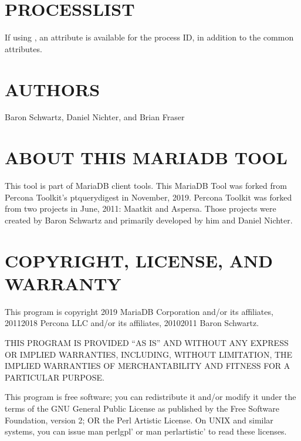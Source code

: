 \documentclass[letterpaper,10pt,english]{sphinxmanual}
\begin{document}
\section{PROCESSLIST}
\label{\detokenize{mariadb-query-digest:processlist}}
\sphinxAtStartPar
If using {\hyperref[\detokenize{mariadb-query-digest:cmdoption-mariadb-query-digest-processlist}]{}}, an  attribute is available for
the process ID, in addition to the common attributes.


\section{AUTHORS}
\label{\detokenize{mariadb-query-digest:authors}}
\sphinxAtStartPar
Baron Schwartz, Daniel Nichter, and Brian Fraser


\section{ABOUT THIS MARIADB TOOL}
\label{\detokenize{mariadb-query-digest:about-this-mariadb-tool}}
\sphinxAtStartPar
This tool is part of MariaDB client tools. This MariaDB Tool was forked from
Percona Toolkit’s pt\sphinxhyphen{}query\sphinxhyphen{}digest in November, 2019.  Percona Toolkit was
forked from two projects in June, 2011: Maatkit and Aspersa.  Those projects
were created by Baron Schwartz and primarily developed by him and Daniel
Nichter.


\section{COPYRIGHT, LICENSE, AND WARRANTY}
\label{\detokenize{mariadb-query-digest:copyright-license-and-warranty}}
\sphinxAtStartPar
This program is copyright 2019 MariaDB Corporation and/or its affiliates,
2011\sphinxhyphen{}2018 Percona LLC and/or its affiliates, 2010\sphinxhyphen{}2011 Baron Schwartz.

\sphinxAtStartPar
THIS PROGRAM IS PROVIDED “AS IS” AND WITHOUT ANY EXPRESS OR IMPLIED
WARRANTIES, INCLUDING, WITHOUT LIMITATION, THE IMPLIED WARRANTIES OF
MERCHANTABILITY AND FITNESS FOR A PARTICULAR PURPOSE.

\sphinxAtStartPar
This program is free software; you can redistribute it and/or modify it under
the terms of the GNU General Public License as published by the Free Software
Foundation, version 2; OR the Perl Artistic License.  On UNIX and similar
systems, you can issue \textasciigrave{}man perlgpl’ or \textasciigrave{}man perlartistic’ to read these
licenses.
\end{document}

